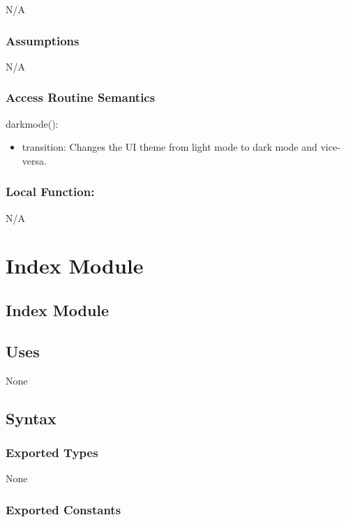 \documentclass[12pt]{article}
\begin{document}
N/A

\subsubsection* {Assumptions}

N/A

\subsubsection* {Access Routine Semantics}

\noindent darkmode():
\begin{itemize}
  \item transition: Changes the UI theme from light mode to dark mode and vice-versa.
\end{itemize}

\subsubsection*{Local Function:}

N/A

\newpage


\section {Index Module}

\subsection* {Index Module}

\subsection* {Uses}

None

\subsection* {Syntax}

\subsubsection* {Exported Types}

None

\subsubsection* {Exported Constants}
\end{document}

